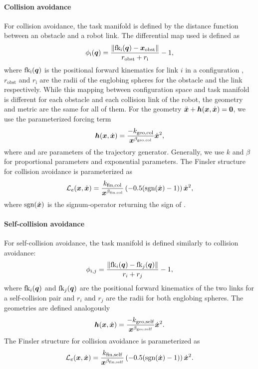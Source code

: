 \paragraph{Collision avoidance}
For collision avoidance, the task manifold \X{} is defined by the distance function between an obstacle and 
a robot link. The differential map used is defined as
\[
    \phi_{\textrm{i}}(\bm{q}) = \frac{\left\lVert\textrm{fk}_{\textrm{i}}(\bm{q}) - \bm{x}_{\textrm{obst}}\right\rVert}{r_{\textrm{obst}} + r_{\textrm{i}}} - 1,
\]
where $\textrm{fk}_{\textrm{i}}(\bm{q})$ is the positional forward kinematics for link $i$ in a configuration \q{},
$r_{\textrm{obst}}$ and $r_{\textrm{i}}$ are the radii of the englobing
spheres for the obstacle and the link respectively. 
While this mapping between configuration space and task manifold is different for each obstacle and each
collision link of the robot, the geometry and metric are the same for all of them.
For the geometry 
$\ddot{\bm{x}} + \bm{h}(\bm{x},\dot{\bm{x}}) = \bm{0}$, we use the parameterized forcing term
\begin{equation}
    \bm{h}(\bm{x},\dot{\bm{x}}) = \frac{-k_{\textrm{geo,col}}}{\bm{x}^{\beta_{\textrm{geo,col}}}}\dot{\bm{x}}^2,
\end{equation}
where \kgeocol{} and \expgeocol{} are parameters of the trajectory generator. Generally, we use $k$ and $\beta$ for
proportional parameters and exponential parameters.
The Finsler structure for collision avoidance is parameterized as 
\begin{equation}
    \mathcal{L}_e(\bm{x},\dot{\bm{x}}) = \frac{k_{\textrm{fin,col}}}{\bm{x}^{\beta_{\textrm{fin,col}}}} \left(-0.5 (\textrm{sgn}(\dot{\bm{x}}) - 1)\right) \dot{\bm{x}}^2,
\end{equation}
where $\textrm{sgn}(\dot{\bm{x}})$ is the signum-operator returning the sign of \xdot{}.

\paragraph{Self-collision avoidance}
For self-collision avoidance, the task manifold \X{} is 
defined similarly to collision avoidance:
\[
    \phi_{i,j} = \frac{\left\lVert\textrm{fk}_i(\bm{q}) - \textrm{fk}_j(\bm{q})\right\rVert}{r_i + r_j} - 1,
\]
where $\textrm{fk}_i(\bm{q})$ and $\textrm{fk}_j(\bm{q})$ are the positional forward kinematics of the two links
for a self-collision pair and $r_i$ and $r_j$ are the 
radii for both englobing spheres.
The geometries are defined analogously 
\begin{equation}
    \bm{h}(\bm{x},\dot{\bm{x}}) = \frac{-k_{\textrm{geo,self}}}{\bm{x}^{\beta_{\textrm{geo,self}}}}\dot{\bm{x}}^2.
\end{equation}
The Finsler structure for collision avoidance is parameterized as 
\begin{equation}
    \mathcal{L}_e(\bm{x},\dot{\bm{x}}) = \frac{k_{\textrm{fin,self}}}{\bm{x}^{\beta_{\textrm{fin,self}}}} \left(-0.5 (\textrm{sgn}(\dot{\bm{x}}) - 1)\right) \dot{\bm{x}}^2.
\end{equation}

